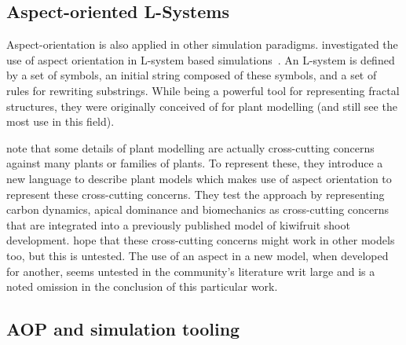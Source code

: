 \subsection{Aspect-oriented L-Systems}
Aspect-orientation is also applied in other simulation paradigms.
\citeauthor{Cieslak_2011} investigated the use of aspect orientation in L-system
based simulations~\cite{Cieslak_2011}. An L-system\cite{lindenmayer1968lsystem}
is defined by a set of symbols, an initial string composed of these symbols, and
a set of rules for rewriting substrings. While being a powerful tool for
representing fractal structures, they were originally conceived of for plant
modelling (and still see the most use in this field).

\citeauthor{Cieslak_2011} note that some details of plant modelling are actually
cross-cutting concerns against many plants or families of plants. To represent
these, they introduce a new language to describe plant models which makes use of
aspect orientation to represent these cross-cutting concerns. They test the
approach by representing carbon dynamics, apical dominance and biomechanics as
cross-cutting concerns that are integrated into a previously published model of
kiwifruit shoot development. \citeauthor{Cieslak_2011} hope that these
cross-cutting concerns might work in other models too, but this is untested. The
use of an aspect in a new model, when developed for another, seems untested in
the community's literature writ large and is a noted omission in the conclusion
of this particular work.



\subsection{AOP and simulation tooling}


